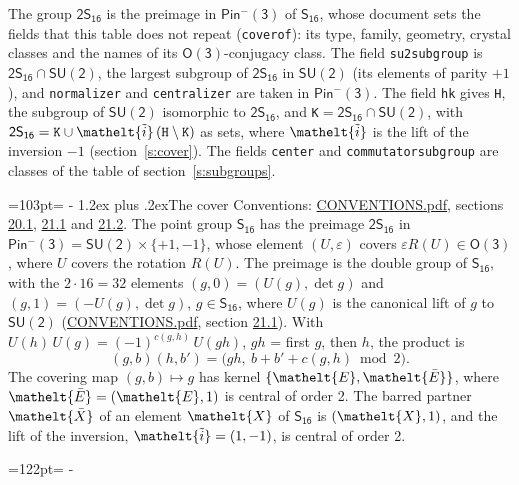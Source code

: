 \documentclass[10pt,a4paper]{article}
\makeatletter
\renewcommand\section{\@startsection{section}{1}{\z@}{-3ex plus -1ex minus -.2ex}%
  {1.2ex plus .2ex}{\normalfont\large\sffamily\bfseries\color{parttitle}}}
\newcommand{\needspace}[1]{\par\penalty-100\begingroup\dimen0=#1\relax\dimen2=\pagegoal
  \advance\dimen2-\pagetotal\ifdim\dimen0>\dimen2\relax\ifdim\dimen2>0pt\vfil\break\fi\fi
  \endgroup}
\numberwithin{equation}{section}
\newcommand{\eltfont}[1]{{\let\sigma\eltsigma\mathelt{#1}}}
\newcommand{\grp}[1]{\mathsf{#1}}
\newcommand{\elt}[1]{\eltfont{#1}}
\newcommand{\dirprod}{\times}
\newcommand{\barred}[1]{\bar{#1}}
\newcommand{\lift}[1]{\tilde{#1}}
\makeatother
\begin{document}
\leavevmode\label{n:element.inversion}\label{n:group.preimage}The group $\grp{2S_{16}}$ is the preimage in $\grp{Pin^{-}(3)}$ of \href{../../../rotation/data/pdf/S16.pdf}{$\grp{S_{16}}$}, whose document sets the fields that this table does not repeat (\texttt{coverof}): its type, family, geometry, crystal classes and the names of its \href{../../../rotation/data/pdf/O3.pdf}{$\grp{O(3)}$}-conjugacy class. The field \texttt{su2subgroup} is $\grp{2S_{16}} \cap \grp{SU(2)}$, the largest subgroup of $\grp{2S_{16}}$ in $\grp{SU(2)}$ (its elements of parity $+1$), and \texttt{normalizer} and \texttt{centralizer} are taken in $\grp{Pin^{-}(3)}$. The field \texttt{hk} gives \texttt{H}, the subgroup of $\grp{SU(2)}$ isomorphic to $\grp{2S_{16}}$, and \texttt{K}${} = \grp{2S_{16}} \cap \grp{SU(2)}$, with $\grp{2S_{16}} = \texttt{K} \cup \elt{\lift{i}}\,(\texttt{H} \setminus \texttt{K})$ as sets, where $\elt{\lift{i}}$ is the lift of the inversion $-1$ (section~\ref{s:cover}). The fields \texttt{center} and \texttt{commutatorsubgroup} are classes of the table of section~\ref{s:subgroups}.
\needspace{103pt}
\section{The cover}\label{s:cover}
Conventions: \href{../../CONVENTIONS.pdf}{CONVENTIONS.pdf}, sections \href{../../CONVENTIONS.pdf\#conv.20.1}{20.1}, \href{../../CONVENTIONS.pdf\#conv.21.1}{21.1} and \href{../../CONVENTIONS.pdf\#conv.21.2}{21.2}.
\leavevmode\label{n:group.pin.minus}\label{n:group.su2}\label{n:local.pin.sign}\label{n:matrix.covered}\label{n:matrix.lift.su2}\label{n:index.bar}The point group $\grp{S_{16}}$ has the preimage $\grp{2S_{16}}$ in $\grp{Pin^{-}(3)} = \grp{SU(2)} \dirprod \{+1, -1\}$, whose element $(U, \varepsilon)$ covers $\varepsilon R(U) \in \grp{O(3)}$, where $U$ covers the rotation $R(U)$. The preimage is the double group of $\grp{S_{16}}$, with the $2 \cdot 16 = 32$ elements $(g, 0) = (U(g), \det g)$ and $(g, 1) = (-U(g), \det g)$, $g \in \grp{S_{16}}$, where $U(g)$ is the canonical lift of $g$ to $\grp{SU(2)}$ (\href{../../CONVENTIONS.pdf}{CONVENTIONS.pdf}, section \href{../../CONVENTIONS.pdf\#conv.21.1}{21.1}). \label{n:function.cocycle}With $U(h)\,U(g) = (-1)^{c(g,h)}\,U(gh)$, $gh$ = first $g$, then $h$, the product is
\begin{equation}\label{e:product}(g, b)(h, b') = \bigl(gh,\ b + b' + c(g, h) \bmod 2\bigr).\end{equation}
\leavevmode\label{n:mark.bar}The covering map $(g, b) \mapsto g$ has kernel $\{\elt{E}, \elt{\barred{E}}\}$, where $\elt{\barred{E}} = (\elt{E}, 1)$ is central of order 2. \label{n:element.named}\label{n:mark.lift}The barred partner $\elt{\barred{X}}$ of an element $\elt{X}$ of $\grp{S_{16}}$ is $(\elt{X}, 1)$, and the lift of the inversion, $\elt{\lift{i}} = (1, -1)$, is central of order 2.
\needspace{122pt}
\end{document}

